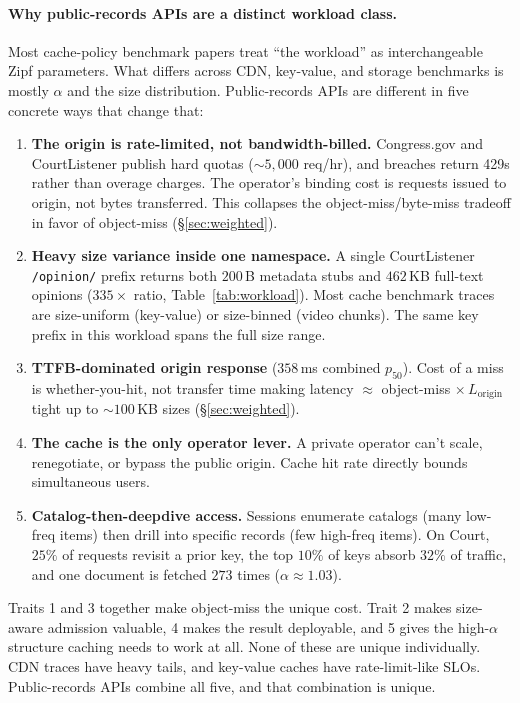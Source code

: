 \documentclass[letterpaper,twocolumn,10pt]{article}
\begin{document}
\paragraph{Why public-records APIs are a distinct workload class.}
Most cache-policy benchmark papers treat ``the workload'' as
interchangeable Zipf parameters. What differs across CDN, key-value,
and storage benchmarks is mostly $\alpha$ and the size distribution.
Public-records APIs are different in five concrete ways that change
that:
\begin{enumerate}[leftmargin=*,itemsep=1pt,topsep=2pt]
  \item \textbf{The origin is rate-limited, not bandwidth-billed.}
    Congress.gov and CourtListener publish hard quotas
    ($\sim 5{,}000$ req/hr), and breaches return 429s rather than
    overage charges. The operator's binding cost is requests
    issued to origin, not bytes transferred. This collapses the
    object-miss/byte-miss tradeoff in favor of object-miss
    (\S\ref{sec:weighted}).
  \item \textbf{Heavy size variance inside one namespace.}
    A single CourtListener \texttt{/opinion/} prefix returns both
    $200$\,B metadata stubs and $462$\,KB full-text opinions
    ($335\times$ ratio, Table~\ref{tab:workload}). Most cache
    benchmark traces are size-uniform (key-value) or size-binned
    (video chunks). The same key prefix in this workload spans the
    full size range.
  \item \textbf{TTFB-dominated origin response} ($358$\,ms combined
    $p_{50}$). Cost of a miss is whether-you-hit, not transfer time
    making latency $\approx$ object-miss $\times \, L_{\text{origin}}$
    tight up to $\sim 100$\,KB sizes (\S\ref{sec:weighted}).
  \item \textbf{The cache is the only operator lever.} A private
    operator can't scale, renegotiate, or bypass the public origin.
    Cache hit rate directly bounds simultaneous users.
  \item \textbf{Catalog-then-deepdive access.} Sessions enumerate
    catalogs (many low-freq items) then drill into specific
    records (few high-freq items). On Court, $25\%$ of requests
    revisit a prior key, the top $10\%$ of keys absorb $32\%$ of
    traffic, and one document is fetched $273$ times
    ($\alpha \approx 1.03$).
\end{enumerate}
Traits 1 and 3 together make object-miss the unique cost. Trait
2 makes size-aware admission valuable, 4 makes the result
deployable, and 5 gives the high-$\alpha$
structure caching needs to work at all. None of these are unique
individually. CDN traces have heavy tails, and key-value caches have
rate-limit-like SLOs. Public-records APIs combine all five, and
that combination is unique.
\end{document}
